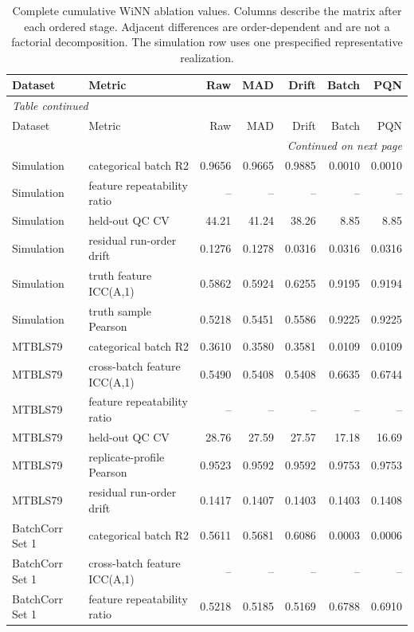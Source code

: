 \begin{landscape}
\tiny
\begin{longtable}{llrrrrr}
\caption{Complete cumulative WiNN ablation values. Columns describe the matrix after each ordered stage. Adjacent differences are order-dependent and are not a factorial decomposition. The simulation row uses one prespecified representative realization.}\label{tab:supp_cumulative}\\
\toprule
Dataset & Metric & Raw & MAD & Drift & Batch & PQN \\
\midrule
\endfirsthead
\multicolumn{7}{l}{\textit{Table \thetable{} continued}}\\
\toprule
Dataset & Metric & Raw & MAD & Drift & Batch & PQN \\
\midrule
\endhead
\midrule
\multicolumn{7}{r}{\textit{Continued on next page}}\\
\endfoot
\bottomrule
\endlastfoot
Simulation & categorical batch R2 & 0.9656 & 0.9665 & 0.9885 & 0.0010 & 0.0010 \\
Simulation & feature repeatability ratio & -- & -- & -- & -- & -- \\
Simulation & held-out QC CV & 44.21 & 41.24 & 38.26 & 8.85 & 8.85 \\
Simulation & residual run-order drift & 0.1276 & 0.1278 & 0.0316 & 0.0316 & 0.0316 \\
Simulation & truth feature ICC(A,1) & 0.5862 & 0.5924 & 0.6255 & 0.9195 & 0.9194 \\
Simulation & truth sample Pearson & 0.5218 & 0.5451 & 0.5586 & 0.9225 & 0.9225 \\
MTBLS79 & categorical batch R2 & 0.3610 & 0.3580 & 0.3581 & 0.0109 & 0.0109 \\
MTBLS79 & cross-batch feature ICC(A,1) & 0.5490 & 0.5408 & 0.5408 & 0.6635 & 0.6744 \\
MTBLS79 & feature repeatability ratio & -- & -- & -- & -- & -- \\
MTBLS79 & held-out QC CV & 28.76 & 27.59 & 27.57 & 17.18 & 16.69 \\
MTBLS79 & replicate-profile Pearson & 0.9523 & 0.9592 & 0.9592 & 0.9753 & 0.9753 \\
MTBLS79 & residual run-order drift & 0.1417 & 0.1407 & 0.1403 & 0.1403 & 0.1408 \\
BatchCorr Set 1 & categorical batch R2 & 0.5611 & 0.5681 & 0.6086 & 0.0003 & 0.0006 \\
BatchCorr Set 1 & cross-batch feature ICC(A,1) & -- & -- & -- & -- & -- \\
BatchCorr Set 1 & feature repeatability ratio & 0.5218 & 0.5185 & 0.5169 & 0.6788 & 0.6910 \\

\end{longtable}
\end{landscape}
